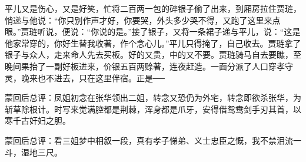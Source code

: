 \begin{parag}
    平儿又是伤心，又是好笑，忙将二百两一包的碎银子偷了出来，到厢房拉住贾琏，悄递与他说：“你只别作声才好，你要哭，外头多少哭不得，又跑了这里来点眼。”贾琏听说，便说：“你说的是。”接了银子，又将一条裙子递与平儿，说：“这是他家常穿的，你好生替我收著，作个念心儿。”平儿只得掩了，自己收去。贾琏拿了银子与众人，走来命人先去买板。好的又贵，中的又不要。贾琏骑马自去要瞧，至晚间果抬了一副好板进来，价银五百两赊著，连夜赶造。一面分派了人口穿孝守灵，晚来也不进去，只在这里伴宿。正是──
\end{parag}


\begin{parag}
    \begin{note}蒙回后总评：凤姐初念在张华领出二姐，转念又恐仍为外宅，转念即欲杀张华，为斩草除根计。时写来觉满腔都是荆棘，浑身都是爪牙，安得借鸳鸯剑手刃其首，以寒千古奸妇之胆。\end{note}
\end{parag}


\begin{parag}
    \begin{note}蒙回后总评：看三姐梦中相叙一段，真有孝子悌弟、义士忠臣之慨，我不禁泪流一斗，湿地三尺。\end{note}
\end{parag}
